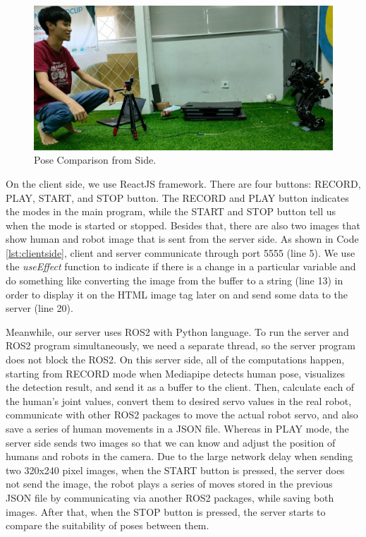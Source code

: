 \begin{figure}[ht]
  \centering
  \includegraphics[scale=0.32]{gambar/pose-comparison.jpeg}
  \caption{Pose Comparison from Side.}
  \label{fig:posecomparisonside}
\end{figure}

On the client side, we use ReactJS framework. There are four buttons: RECORD, PLAY, START, and STOP button. The RECORD and PLAY button indicates the modes in the main program, while the START and STOP button tell us when the mode is started or stopped.
Besides that, there are also two images that show human and robot image that is sent from the server side. As shown in Code \ref{lst:clientside}, client and server communicate through port 5555 (line 5).
We use the \emph{useEffect} function to indicate if there is a change in a particular variable and do something like converting the image from the buffer to a string (line 13) in order to display it on the HTML image tag later on and send some data to the server (line 20).



Meanwhile, our server uses ROS2 with Python language. To run the server and ROS2 program simultaneously, we need a separate thread, so the server program does not block the ROS2.
On this server side, all of the computations happen, starting from RECORD mode when Mediapipe detects human pose, visualizes the detection result, and send it as a buffer to the client.
Then, calculate each of the human's joint values, convert them to desired servo values in the real robot, communicate with other ROS2 packages to move the actual robot servo, and also save a series of human movements in a JSON file.
Whereas in PLAY mode, the server side sends two images so that we can know and adjust the position of humans and robots in the camera. Due to the large network delay when sending two 320x240 pixel images, when the START button is pressed,
the server does not send the image, the robot plays a series of moves stored in the previous JSON file by communicating via another ROS2 packages, while saving both images. After that, when the STOP button is pressed, the server starts to compare the suitability of poses between them.